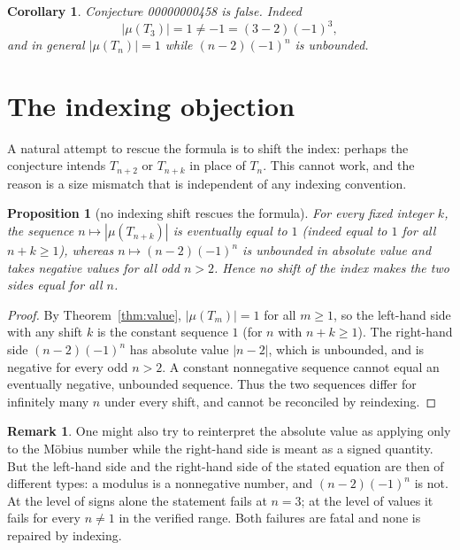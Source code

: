 \documentclass[11pt]{article}
\newtheorem{proposition}[theorem]{Proposition}
\newtheorem{corollary}[theorem]{Corollary}
\theoremstyle{definition}
\newtheorem{remark}[theorem]{Remark}
\begin{document}
\begin{corollary}\label{cor:false-value}
Conjecture 00000000458 is false. Indeed
\[
|\mu(T_3)|=1\ne -1=(3-2)(-1)^3,
\]
and in general $|\mu(T_n)|=1$ while $(n-2)(-1)^n$ is unbounded.
\end{corollary}

\section{The indexing objection}

A natural attempt to rescue the formula is to shift the index: perhaps the
conjecture intends $T_{n+2}$ or $T_{n+k}$ in place of $T_n$. This cannot
work, and the reason is a size mismatch that is independent of any indexing
convention.

\begin{proposition}[no indexing shift rescues the formula]
For every fixed integer $k$, the sequence $n\mapsto|\mu(T_{n+k})|$ is
eventually equal to $1$ (indeed equal to $1$ for all $n+k\ge 1$), whereas
$n\mapsto(n-2)(-1)^n$ is unbounded in absolute value and takes negative
values for all odd $n>2$. Hence no shift of the index makes the two sides
equal for all $n$.
\end{proposition}

\begin{proof}
By Theorem~\ref{thm:value}, $|\mu(T_m)|=1$ for all $m\ge 1$, so the
left-hand side with any shift $k$ is the constant sequence $1$ (for $n$ with
$n+k\ge 1$). The right-hand side $(n-2)(-1)^n$ has absolute value $|n-2|$,
which is unbounded, and is negative for every odd $n>2$. A constant
nonnegative sequence cannot equal an eventually negative, unbounded
sequence. Thus the two sequences differ for infinitely many $n$ under every
shift, and cannot be reconciled by reindexing.
\end{proof}

\begin{remark}
One might also try to reinterpret the absolute value as applying only to the
M\"obius number while the right-hand side is meant as a signed quantity.
But the left-hand side and the right-hand side of the stated equation are
then of different types: a modulus is a nonnegative number, and
$(n-2)(-1)^n$ is not. At the level of signs alone the statement fails at
$n=3$; at the level of values it fails for every $n\ne1$ in the verified
range. Both failures are fatal and none is repaired by indexing.
\end{remark}
\end{document}
